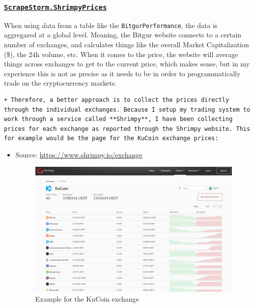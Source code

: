 \documentclass[]{book}
\begin{document}
\hypertarget{scrapestorm.shrimpyprices}{%
\subsubsection{\texorpdfstring{\href{https://predictcryptodb.com/question/8}{\textbf{\texttt{ScrapeStorm.ShrimpyPrices}}}}{ScrapeStorm.ShrimpyPrices}}\label{scrapestorm.shrimpyprices}}

When using data from a table like the \texttt{BitgurPerformance}, the data is aggregared at a global level. Meaning, the Bitgur website connects to a certain number of exchanges, and calculates things like the overall Market Capitalization (\$), the 24h volume, etc. When it comes to the price, the website will average things across exchanges to get to the current price, which makes sense, but in my experience this is not as precise as it needs to be in order to programmatically trade on the cryptocurrency markets.

\begin{verbatim}
+ Therefore, a better approach is to collect the prices directly through the individual exchanges. Because I setup my trading system to work through a service called **Shrimpy**, I have been collecting prices for each exchange as reported through the Shrimpy website. This for example would be the page for the KuCoin exchange prices:
\end{verbatim}

\begin{itemize}
\item
  Source: \url{https://www.shrimpy.io/exchange}

  \begin{figure}
  \centering
  \includegraphics{images/ShrimpyKucoin.png}
  \caption{Example for the KuCoin exchange}
  \end{figure}
\end{itemize}
\end{document}
